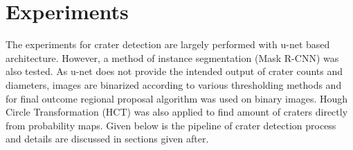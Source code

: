 \documentclass[11pt]{article}
\begin{document}

\section{Experiments}
The experiments for crater detection are largely performed with u-net based architecture. However, a method of instance segmentation (Mask R-CNN) was also tested. As u-net does not provide the intended output of crater counts and diameters, images are binarized according to various thresholding methods and for final outcome regional proposal algorithm was used on binary images. Hough Circle Transformation (HCT) was also applied to find amount of craters directly from probability maps. Given below is the pipeline of crater detection process and details are discussed in sections given after.
\end{document}
